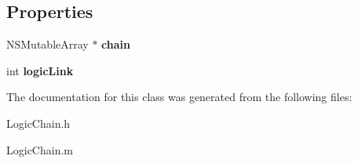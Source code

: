 \subsection*{\-Properties}
\begin{DoxyCompactItemize}
\item 
\hypertarget{interface_logic_chain_ad1259f02ddf13aab7310a0c64855d34b}{
\-N\-S\-Mutable\-Array $\ast$ {\bfseries chain}}
\label{interface_logic_chain_ad1259f02ddf13aab7310a0c64855d34b}

\item 
\hypertarget{interface_logic_chain_a6a9b28d80359452f6204ea1c885db6ee}{
int {\bfseries logic\-Link}}
\label{interface_logic_chain_a6a9b28d80359452f6204ea1c885db6ee}

\end{DoxyCompactItemize}


\-The documentation for this class was generated from the following files\-:\begin{DoxyCompactItemize}
\item 
\-Logic\-Chain.\-h\item 
\-Logic\-Chain.\-m\end{DoxyCompactItemize}

